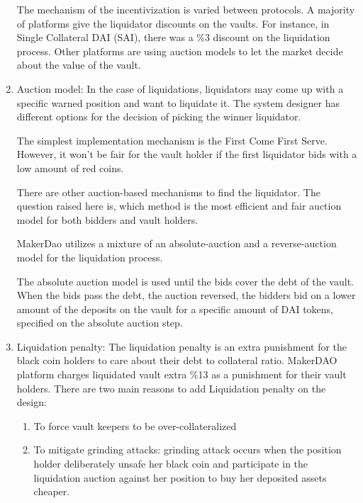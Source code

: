 \begin{enumerate}
The mechanism of the incentivization is varied between protocols. A majority of platforms give the liquidator discounts on the vaults. For instance, in Single Collateral DAI (SAI), there was a \%3 discount on the liquidation process. Other platforms are using auction models to let the market decide about the value of the vault. 
  
  \item Auction model:
In the case of liquidations,  liquidators may come up with a specific warned position and want to liquidate it. The system designer has different options for the decision of picking the winner liquidator.
 
The simplest implementation mechanism is the First Come First Serve. However, it won't be fair for the vault holder if the first liquidator bids with a low amount of red coins.

There are other auction-based mechanisms to find the liquidator. The question raised here is, which method is the most efficient and fair auction model for both bidders and vault holders.

MakerDao utilizes a mixture of an absolute-auction and a reverse-auction model for the liquidation process.

The absolute auction model is used until the bids cover the debt of the vault. When the bids pass the debt, the auction reversed, the bidders bid on a lower amount of the deposits on the vault for a specific amount of DAI tokens, specified on the absolute auction step.
  
  \item Liquidation penalty:
The liquidation penalty is an extra punishment for the black coin holders to care about their debt to collateral ratio.
MakerDAO platform charges liquidated vault extra \%13 as a punishment for their vault holders. There are two main reasons to add Liquidation penalty on the design:

\begin{enumerate}

  \item To force vault keepers to be over-collateralized
  \item To mitigate grinding attacks: grinding attack occurs when the position holder deliberately unsafe her black coin and participate in the liquidation auction against her position to buy her deposited assets cheaper.

\end{enumerate}
\end{enumerate}

